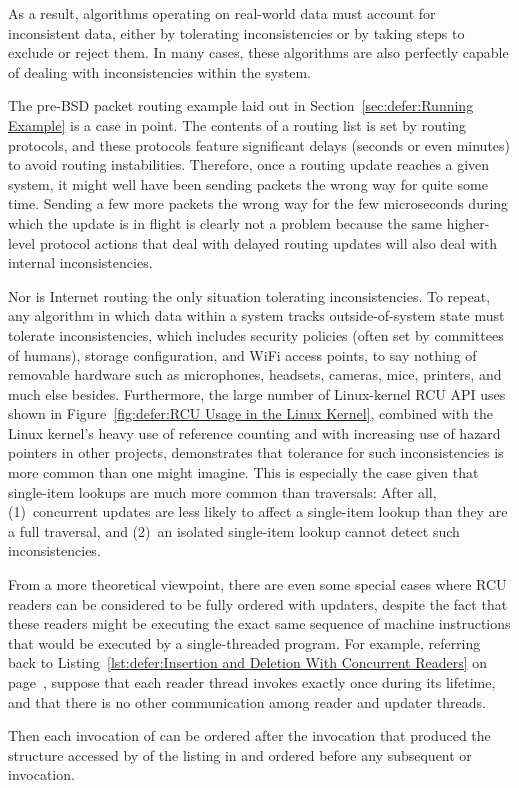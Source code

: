 As a result, algorithms operating on real-world data must account for
inconsistent data, either by tolerating inconsistencies or by taking
steps to exclude or reject them.
In many cases, these algorithms are also perfectly capable of dealing
with inconsistencies within the system.

The pre-BSD packet routing example laid out in
Section~\ref{sec:defer:Running Example}
is a case in point.
The contents of a routing list is set by routing protocols, and these
protocols feature significant delays (seconds or even minutes) to avoid
routing instabilities.
Therefore, once a routing update reaches a given system,
it might well have been sending packets the wrong way for quite some time.
Sending a few more packets the wrong way for the few microseconds during
which the update is in flight is clearly not a problem because the same
higher-level protocol actions that deal with delayed routing updates
will also deal with internal inconsistencies.

Nor is Internet routing the only situation tolerating inconsistencies.
To repeat, any algorithm in which data within a system tracks
outside-of-system state must tolerate inconsistencies, which includes
security policies (often set by committees of humans), storage configuration,
and WiFi access points, to say nothing of removable hardware such as
microphones, headsets, cameras, mice, printers, and much else besides.
Furthermore, the large number of Linux-kernel RCU API uses shown in
Figure~\ref{fig:defer:RCU Usage in the Linux Kernel},
combined with the Linux kernel's heavy use of reference counting
and with increasing use of hazard pointers in other projects, demonstrates
that tolerance for such inconsistencies is more common than one might
imagine.
This is especially the case given that single-item lookups are much more
common than traversals:  After all, (1)~concurrent updates are less likely
to affect a single-item lookup than they are a full traversal, and
(2)~an isolated single-item lookup cannot detect such inconsistencies.

From a more theoretical viewpoint, there are even some special cases where
RCU readers can be considered to be fully ordered with updaters, despite
the fact that these readers might be executing the exact same sequence of
machine instructions that would be executed by a single-threaded program.
For example, referring back to
Listing~\ref{lst:defer:Insertion and Deletion With Concurrent Readers}
on page~\pageref{lst:defer:Insertion and Deletion With Concurrent Readers},
suppose that each reader thread invokes  exactly
once during its lifetime, and that there is no other communication among
reader and updater threads.
\begin{fcvref}
Then each invocation of  can be ordered after the
 invocation that produced the  structure
accessed by  of the listing in 
and ordered before any subsequent
 or  invocation.
\end{fcvref}

